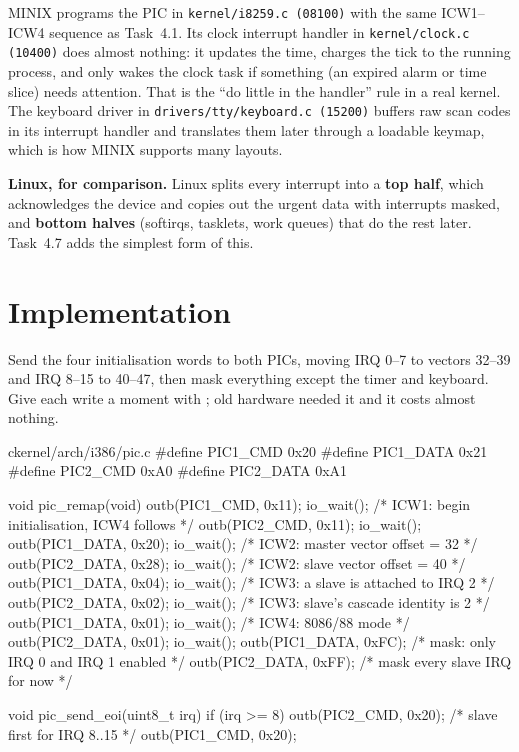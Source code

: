 \documentclass[11pt,a4paper]{article}
\begin{document}
\begin{minixbox}
MINIX programs the PIC in \texttt{kernel/i8259.c (08100)} with the same ICW1--ICW4 sequence as Task~4.1. Its clock
interrupt handler in \texttt{kernel/clock.c (10400)} does almost nothing: it updates the time, charges the tick to
the running process, and only wakes the clock task if something (an expired alarm or time slice) needs attention.
That is the ``do little in the handler'' rule in a real kernel. The keyboard driver in
\texttt{drivers/tty/keyboard.c (15200)} buffers raw scan codes in its interrupt handler and translates them later
through a loadable keymap, which is how MINIX supports many layouts.

\par\smallskip\textbf{Linux, for comparison.} \LKD Linux splits every interrupt into a \textbf{top half}, which acknowledges the device and copies out the urgent data with interrupts masked, and \textbf{bottom halves} (softirqs, tasklets, work queues) that do the rest later. Task~4.7 adds the simplest form of this.
\end{minixbox}

\section{Implementation}

Send the four initialisation words to both PICs, moving IRQ 0--7 to vectors 32--39 and IRQ 8--15 to 40--47, then mask
everything except the timer and keyboard. Give each write a moment with ; old hardware needed it and
it costs almost nothing.

\begin{lst}{c}{kernel/arch/i386/pic.c}
#define PIC1_CMD  0x20
#define PIC1_DATA 0x21
#define PIC2_CMD  0xA0
#define PIC2_DATA 0xA1

void pic_remap(void)
{
    outb(PIC1_CMD,  0x11); io_wait();   /* ICW1: begin initialisation, ICW4 follows */
    outb(PIC2_CMD,  0x11); io_wait();
    outb(PIC1_DATA, 0x20); io_wait();   /* ICW2: master vector offset = 32          */
    outb(PIC2_DATA, 0x28); io_wait();   /* ICW2: slave vector offset  = 40          */
    outb(PIC1_DATA, 0x04); io_wait();   /* ICW3: a slave is attached to IRQ 2       */
    outb(PIC2_DATA, 0x02); io_wait();   /* ICW3: slave's cascade identity is 2      */
    outb(PIC1_DATA, 0x01); io_wait();   /* ICW4: 8086/88 mode                       */
    outb(PIC2_DATA, 0x01); io_wait();
    outb(PIC1_DATA, 0xFC);              /* mask: only IRQ 0 and IRQ 1 enabled       */
    outb(PIC2_DATA, 0xFF);              /* mask every slave IRQ for now             */
}

void pic_send_eoi(uint8_t irq)
{
    if (irq >= 8)
        outb(PIC2_CMD, 0x20);           /* slave first for IRQ 8..15 */
    outb(PIC1_CMD, 0x20);
}
\end{lst}
\end{document}
